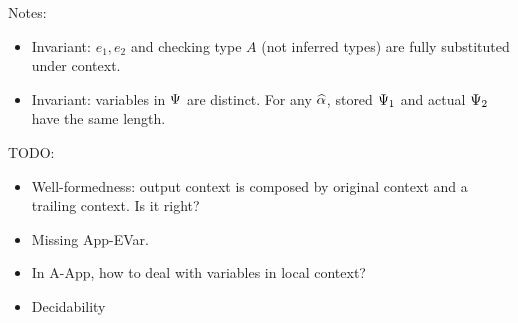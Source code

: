 Notes:
\begin{itemize}
  \item Invariant: $e_1, e_2$ and checking type $A$ (not inferred types) are
    fully substituted under context.
    \item Invariant: variables in $\Psi$ are distinct. For any $\widehat{\alpha}$, stored
      $\Psi_1$ and actual $\Psi_2$ have the same length.
\end{itemize}

TODO:
\begin{itemize}
  \item Well-formedness: output context is composed by original context and a
    trailing context. Is it right?
  \item Missing App-EVar.
  \item In A-App, how to deal with variables in local context?
  \item Decidability
\end{itemize}

